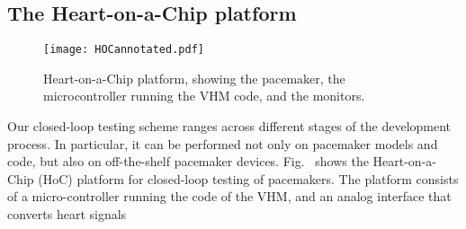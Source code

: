 \subsection{The Heart-on-a-Chip platform}
\label{HoC}

\begin{figure}[!t]
	\centering
	\texttt{[image: HOCannotated.pdf]}		
	\caption{\small Heart-on-a-Chip platform, showing the pacemaker, the microcontroller running the VHM code, and the monitors.}
	\label{fig:hoc}
\end{figure} 

Our closed-loop testing scheme ranges across different stages of the development process. 
In particular, it can be performed not only on pacemaker models and code, but also on off-the-shelf pacemaker devices. Fig.~ shows the Heart-on-a-Chip (HoC) platform for closed-loop testing of pacemakers. 
The platform consists of a micro-controller running the code of the VHM, and an analog interface that converts heart signals
